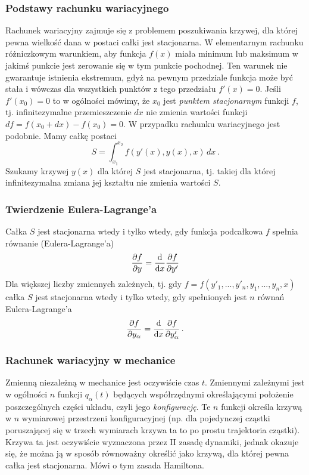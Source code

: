 \documentclass[../main.tex]{subfiles}
\begin{document}
\subsubsection{Podstawy rachunku wariacyjnego}
Rachunek wariacyjny zajmuje się z problemem poszukiwania krzywej, dla której pewna wielkość dana w
postaci całki jest stacjonarna. W elementarnym rachunku różniczkowym warunkiem, aby funkcja \(f(x)\)
miała minimum lub maksimum w jakimś punkcie jest zerowanie się w tym punkcie pochodnej. Ten warunek
nie gwarantuje istnienia ekstremum, gdyż na pewnym przedziale funkcja może być stała i wówczas dla
wszystkich punktów z tego przedziału \(f'(x)=0\). Jeśli \(f'(x_0)=0\) to w ogólności mówimy, że
\(x_0\) jest \textit{punktem stacjonarnym} funkcji \(f\), tj. infinitezymalne przemieszczenie \(dx\)
nie zmienia wartości funkcji \(df=f(x_0+dx)-f(x_0)=0\). W przypadku rachunku wariacyjnego jest
podobnie. Mamy całkę postaci
\begin{equation*}
    S=\int_{x_1}^{x_2}f(y'(x),y(x),x)\,dx\,.
\end{equation*}
Szukamy krzywej \(y(x)\) dla której \(S\) jest stacjonarna, tj. takiej dla której infinitezymalna
zmiana jej kształtu nie zmienia wartości \(S\).
\subsubsection*{Twierdzenie Eulera-Lagrange'a}
Całka \(S\) jest stacjonarna wtedy i tylko wtedy, gdy funkcja podcałkowa \(f\) spełnia równanie
(Eulera-Lagrange'a)
\begin{equation*}
    \frac{\partial f}{\partial y}=\dv{}{x}\frac{\partial f}{\partial y'}
\end{equation*}
Dla większej liczby zmiennych zależnych, tj. gdy \(f=f(y'_1,...,y'_n,y_1,...,y_n,x)\) całka \(S\)
jest stacjonarna wtedy i tylko wtedy, gdy spełnionych jest \(n\) równań Eulera-Lagrange'a
\begin{equation*}
    \frac{\partial f}{\partial y_{\alpha}}=\dv{}{x}\frac{\partial f}{\partial y'_\alpha}\,.
\end{equation*}
\subsubsection{Rachunek wariacyjny w mechanice}
Zmienną niezależną w mechanice jest oczywiście czas \(t\). Zmiennymi zależnymi jest w ogólności
\(n\) funkcji \(q_\alpha(t)\) będących współrzędnymi określającymi położenie poszczególnych części
układu, czyli jego \textit{konfigurację}. Te \(n\) funkcji określa krzywą w \(n\) wymiarowej
przestrzeni konfiguracyjnej (np. dla pojedynczej cząstki poruszającej się w trzech wymiarach krzywa
ta to po prostu trajektoria cząstki). Krzywa ta jest oczywiście wyznaczona przez II zasadę dynamiki,
jednak okazuje się, że można ją w sposób równoważny określić jako krzywą, dla której pewna całka
jest stacjonarna. Mówi o tym zasada Hamiltona.
\medskip
\end{document}
